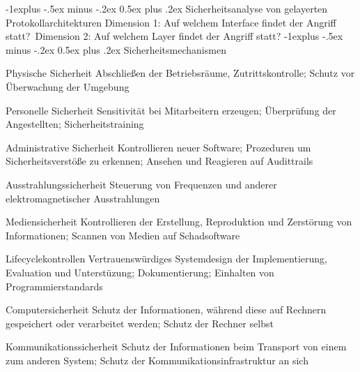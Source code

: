 \documentclass[a4paper]{article}
\makeatletter
\renewcommand{\subsection}{\@startsection{subsection}{2}{0mm}%
                                {-1explus -.5ex minus -.2ex}%
                                {0.5ex plus .2ex}%
                                {\normalfont\normalsize\bfseries}}
\makeatother
\begin{document}
\begin{multicols}{3}
    \subsection{Sicherheitsanalyse von gelayerten Protokollarchitekturen}
    Dimension 1: Auf welchem Interface findet der Angriff statt?\
    Dimension 2: Auf welchem Layer findet der Angriff statt?
    \subsection{Sicherheitsmechanismen}
    \begin{description*}
        \item[Physische Sicherheit] Abschließen der Betriebsräume, Zutrittskontrolle; Schutz vor Überwachung der Umgebung
        \item[Personelle Sicherheit] Sensitivität bei Mitarbeitern erzeugen; Überprüfung der Angestellten; Sicherheitstraining
        \item[Administrative Sicherheit] Kontrollieren neuer Software; Prozeduren um Sicherheitsverstöße zu erkennen; Ansehen und Reagieren auf Audittrails
        \item[Ausstrahlungssicherheit] Steuerung von Frequenzen und anderer elektromagnetischer Ausstrahlungen
        \item[Mediensicherheit] Kontrollieren der Erstellung, Reproduktion und Zerstörung von Informationen; Scannen von Medien auf Schadsoftware
        \item[Lifecyclekontrollen] Vertrauenswürdiges Systemdesign der Implementierung, Evaluation und Unterstüzung; Dokumentierung; Einhalten von Programmierstandards
        \item[Computersicherheit] Schutz der Informationen, während diese auf Rechnern gespeichert oder verarbeitet werden; Schutz der Rechner selbst
        \item[Kommunikationssicherheit] Schutz der Informationen beim Transport von einem zum anderen System; Schutz der Kommunikationsinfrastruktur an sich
    \end{description*}

\end{multicols}
\end{document}
